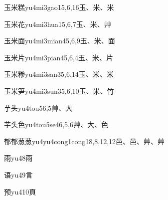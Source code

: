 \begin{entry}{玉米糕}{yu4mi3gao1}{5,6,16}{⽟、⽶、⽶}
\end{entry}

\begin{entry}{玉米花}{yu4mi3hua1}{5,6,7}{⽟、⽶、⾋}
\end{entry}

\begin{entry}{玉米面}{yu4mi3mian4}{5,6,9}{⽟、⽶、⾯}
\end{entry}

\begin{entry}{玉米片}{yu4mi3pian4}{5,6,4}{⽟、⽶、⽚}
\end{entry}

\begin{entry}{玉米糁}{yu4mi3san3}{5,6,14}{⽟、⽶、⽶}
\end{entry}

\begin{entry}{玉米笋}{yu4mi3sun3}{5,6,10}{⽟、⽶、⽵}
\end{entry}

\begin{entry}{芋头}{yu4tou5}{6,5}{⾋、⼤}
\end{entry}

\begin{entry}{芋头色}{yu4tou5se4}{6,5,6}{⾋、⼤、⾊}
\end{entry}

\begin{entry}{郁郁葱葱}{yu4yu4cong1cong1}{8,8,12,12}{⾢、⾢、⾋、⾋}
\end{entry}

\begin{entry}{雨}{yu4}{8}{⾬}
\end{entry}

\begin{entry}{语}{yu4}{9}{⾔}
\end{entry}

\begin{entry}{预}{yu4}{10}{⾴}
\end{entry}

